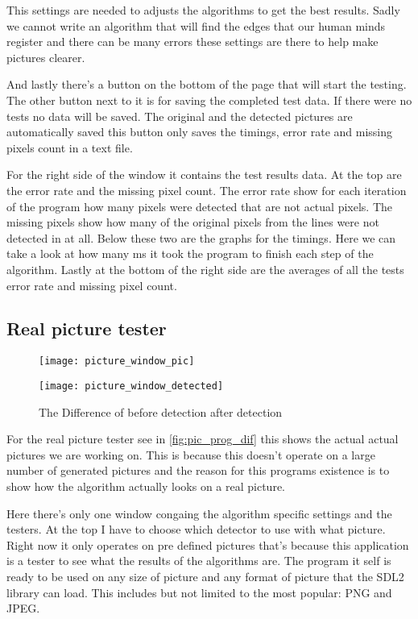 This settings are needed to adjusts the algorithms to get the best results. Sadly we cannot write an algorithm that will find the edges that our human minds register and there can be many errors these settings are there to help make pictures clearer.

And lastly there's a button on the bottom of the page that will start the testing. The other button next to it is for saving the completed test data. If there were no tests no data will be saved. The original and the detected pictures are automatically saved this button only saves the timings, error rate and missing pixels count in a text file.

For the right side of the window it contains the test results data. At the top are the error rate and the missing pixel count. The error rate show for each iteration of the program how many pixels were detected that are not actual pixels. The missing pixels show how many of the original pixels from the lines were not detected in at all. Below these two are the graphs for the timings. Here we can take a look at how many \ac{ms} it took the program to finish each step of the algorithm. Lastly at the bottom of the right side are the averages of all the tests error rate and missing pixel count.

\subsection{Real picture tester}
\label{chap:real_pic_tester}

\begin{figure}[H]
\centering
\begin{minipage}[t]{.49\textwidth}
\centering
\texttt{[image: picture\_window\_pic]}
\end{minipage}
\begin{minipage}[t]{.49\textwidth}
\centering
\texttt{[image: picture\_window\_detected]}
\end{minipage}
\caption{The Difference of before detection after detection}
\label{fig:pic_prog_dif}
\end{figure}

For the real picture tester see in \autoref{fig:pic_prog_dif} this shows the actual actual pictures we are working on. This is because this doesn't operate on a large number of generated pictures and the reason for this programs existence is to show how the algorithm actually looks on a real picture.

Here there's only one window congaing the algorithm specific settings and the testers. At the top I have to choose which detector to use with what picture. Right now it only operates on pre defined pictures that's because this application is a tester to see what the results of the algorithms are. The program it self is ready to be used on any size of picture and any format of picture that the \ac{SDL2} library can load. This includes but not limited to the most popular: \ac{PNG} and \ac{JPEG}.

